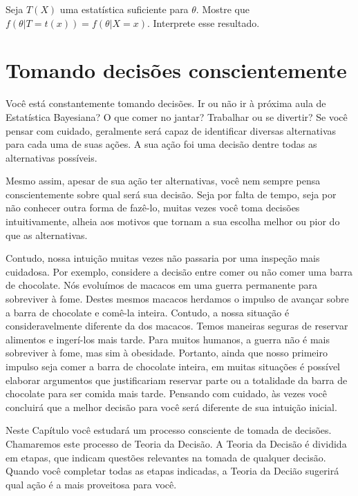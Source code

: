 \begin{exercise}
Seja $T(X)$ uma estatística suficiente para $\theta$. Mostre que 
$f(\theta|T=t(x))=f(\theta|X=x)$. Interprete esse resultado.
\end{exercise}


\section{Tomando decisões conscientemente}
\label{section:decisions}

Você está constantemente tomando decisões.
Ir ou não ir à próxima aula de Estatística Bayesiana?
O que comer no jantar?
Trabalhar ou se divertir?
Se você pensar com cuidado, 
geralmente será capaz de identificar
diversas alternativas para cada uma
de suas ações.
A sua ação foi uma decisão
dentre todas as alternativas possíveis.

Mesmo assim, apesar de sua ação ter alternativas,
você nem sempre pensa conscientemente sobre
qual será sua decisão.
Seja por falta de tempo,
seja por não conhecer outra forma de fazê-lo,
muitas vezes você toma decisões intuitivamente,
alheia aos motivos que tornam a sua escolha
melhor ou pior do que as alternativas.

Contudo, nossa intuição
muitas vezes não passaria por
uma inspeção mais cuidadosa.
Por exemplo, considere a decisão entre
comer ou não comer uma barra de chocolate.
Nós evoluímos de macacos
em uma guerra permanente para sobreviver à fome.
Destes mesmos macacos 
herdamos o impulso de avançar sobre
a barra de chocolate e comê-la inteira.
Contudo, a nossa situação é consideravelmente
diferente da dos macacos.
Temos maneiras seguras de reservar alimentos
e ingerí-los mais tarde.
Para muitos humanos,
a guerra não é mais sobreviver à fome,
mas sim à obesidade.
Portanto, ainda que nosso primeiro impulso seja
comer a barra de chocolate inteira,
em muitas situações é possível elaborar argumentos
que justificariam reservar parte ou a totalidade da
barra de chocolate para ser comida mais tarde.
Pensando com cuidado, 
às vezes você concluirá que a melhor decisão para você
será diferente de sua intuição inicial.

Neste Capítulo você estudará um processo consciente
de tomada de decisões.
Chamaremos este processo de Teoria da Decisão.
A Teoria da Decisão é dividida em etapas,
que indicam questões relevantes na tomada de qualquer decisão.
Quando você completar todas as etapas indicadas,
a Teoria da Decião sugerirá
qual ação é a mais proveitosa para você.

